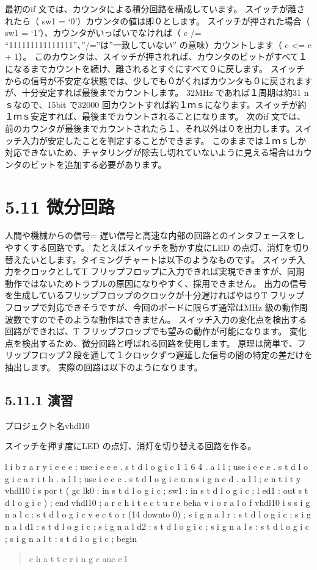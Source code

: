 \documentclass[letterpaper,10pt,dvipdfmx]{sphinxmanual}
\begin{document}
最初のif 文では、カウンタによる積分回路を構成しています。
スイッチが離されたら（ sw1 = `0'）カウンタの値は即０とします。
スイッチが押された場合（ sw1 = `1'）、カウンタがいっぱいでなければ（ c /= ``111111111111111''、''/=''は''一致していない'' の意味）カウントします（ c \textless{}= c + 1）。
このカウンタは、スイッチが押されれば、カウンタのビットがすべて１になるまでカウントを続け、離されるとすぐにすべて０に戻します。
スイッチからの信号が不安定な状態では、少しでも０がくればカウンタも０に戻されますが、十分安定すれば最後までカウントします。
32MHz であれば１周期は約31 n ｓなので、15bit で32000 回カウントすれば約１ｍｓになります。スイッチが約１ｍｓ安定すれば、最後までカウントされることになります。
次のif 文では、前のカウンタが最後までカウントされたら１、それ以外は０を出力します。スイッチ入力が安定したことを判定することができます。
このままでは１ｍｓしか対応できないため、チャタリングが除去し切れていないように見える場合はカウンタのビットを追加する必要があります。


\section{5.11 微分回路}
\label{05_try:id18}
人間や機械からの信号= 遅い信号と高速な内部の回路とのインタフェースをしやすくする回路です。
たとえばスイッチを動かす度にLED の点灯、消灯を切り替えたいとします。タイミングチャートは以下のようなものです。
スイッチ入力をクロックとしてT フリップフロップに入力できれば実現できますが、同期動作ではないためトラブルの原因になりやすく、採用できません。
出力の信号を生成しているフリップフロップのクロックが十分遅ければやはりT フリップフロップで対応できそうですが、今回のボードに限らず通常はMHz 級の動作周波数ですのでそのような動作はできません。
スイッチ入力の変化点を検出する回路ができれば、T フリップフロップでも望みの動作が可能になります。
変化点を検出するため、微分回路と呼ばれる回路を使用します。
原理は簡単で、フリップフロップ２段を通して１クロックずつ遅延した信号の間の特定の差だけを抽出します。
実際の回路は以下のようになります。


\subsection{5.11.1 演習}
\label{05_try:id19}
プロジェクト名vhdl10

スイッチを押す度にLED の点灯、消灯を切り替える回路を作る。

l i b r a r y i e e e ;
use i e e e . s t d l o g i c 1 1 6 4 . a l l ;
use i e e e . s t d l o g i c a r i t h . a l l ;
use i e e e . s t d l o g i c u n s i g n e d . a l l ;
e n t i t y vhdl10 i s
por t (
gc lk0 : in s t d l o g i c ;
sw1 : in s t d l o g i c ;
l ed1 : out s t d l o g i c
) ;
end vhdl10 ;
a r c h i t e c t u r e beha v i o r a l o f vhdl10 i s
s i g n a l c : s t d l o g i c v e c t o r (14 downto 0) ;
s i g n a l r : s t d l o g i c ;
s i g n a l d1 : s t d l o g i c ;
s i g n a l d2 : s t d l o g i c ;
s i g n a l s : s t d l o g i c ;
s i g n a l t : s t d l o g i c ;
begin
\begin{quote}

c h a t t e r i n g c anc e l
\end{quote}
\end{document}
